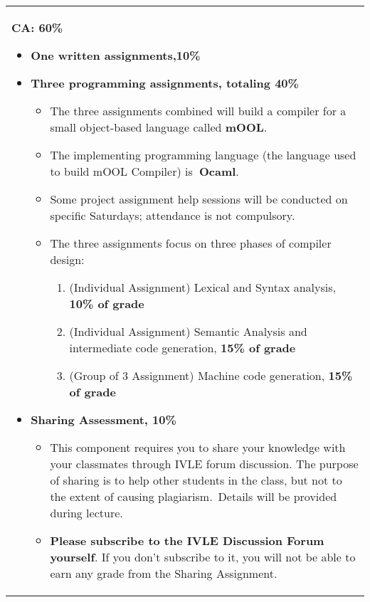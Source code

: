 \begin{longtable}[]{@{}l@{}}
\toprule
\begin{minipage}[t]{0.97\columnwidth}\raggedright\strut
\protect\hypertarget{ctl00_ctl00_ContentPlaceHolder1_ContentPlaceHolder1_LV_CourseInfo_ctrl5_lblCourseInfo}{}{{\textbf{{CA:
60\%}}} }

\begin{itemize}
\tightlist
\item
  \textbf{{{One written assignments,10\%}}}
\item
  \textbf{{{Three programming assignments, totaling 40\%}}}

  \begin{itemize}
  \tightlist
  \item
    The three assignments combined will build a compiler for a small
    object-based language called \textbf{{mOOL}}.
  \item
    The implementing programming language (the language used to build
    mOOL Compiler) is\textbf{{~Ocaml}}.
  \item
    Some project assignment help sessions will be conducted on specific
    Saturdays; attendance is not compulsory.
  \item
    The three assignments focus on three phases of compiler design:

    \begin{enumerate}
    \tightlist
    \item
      (Individual Assignment) Lexical and Syntax analysis, {\textbf{10\%
      of grade}}
    \item
      (Individual Assignment) Semantic Analysis and intermediate code
      generation, \textbf{{15\% of grade}}
    \item
      (Group of 3 Assignment) Machine code generation, {\textbf{15\% of
      grade}}
    \end{enumerate}
  \end{itemize}
\item
  {\textbf{{Sharing Assessment, 10\%}}}

  \begin{itemize}
  \tightlist
  \item
    This component requires you to share your knowledge with your
    classmates through IVLE forum discussion. The purpose of sharing is
    to help other students in the class, but not to the extent of
    causing plagiarism.~Details will be provided during lecture.
  \item
    \textbf{{Please subscribe to the IVLE Discussion Forum yourself}}.
    If you don't subscribe to it, you will not be able to earn any grade
    from the Sharing Assignment.~
  \end{itemize}
\end{itemize}


\end{minipage}
\end{longtable}
